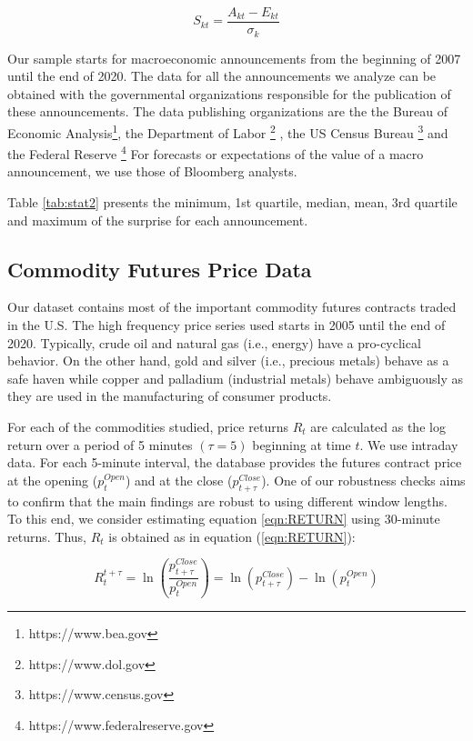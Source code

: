 \documentclass[12pt]{article}
\begin{document}
\begin{equation}\label{eqn:SURPRISE}
S_{kt}=\frac{A_{kt}-E_{kt}}{\sigma_k}
\end{equation}

Our sample starts for macroeconomic announcements from the beginning of 2007 until the end of 2020. The data for all the announcements we analyze can be obtained with the governmental organizations responsible for the publication of these announcements. The data publishing organizations are the the Bureau of Economic Analysis\footnote{https://www.bea.gov}, the Department of Labor \footnote{https://www.dol.gov} , the US Census Bureau \footnote{https://www.census.gov}  and the  Federal Reserve \footnote{https://www.federalreserve.gov}
For forecasts or expectations of the value of a macro announcement, we use those of Bloomberg analysts. 

Table \ref{tab:stat2} presents the minimum, 1st quartile, median, mean, 3rd quartile and maximum of the surprise for each announcement. 
\subsection{Commodity Futures Price Data}

Our dataset contains most of the important commodity futures contracts traded in the U.S. The high frequency price series used starts in 2005 until the end of 2020.
Typically, crude oil and natural gas (i.e., energy) have a pro-cyclical behavior. On the other hand, gold and silver (i.e., precious metals) behave as a safe haven while copper and palladium (industrial metals) behave ambiguously as they are used in the manufacturing of consumer products.


For each of the commodities studied, price returns $R_t$ are calculated as the log return over a period of 5 minutes $(\tau=5)$ beginning at time $t$. We use intraday data. For each 5-minute interval, the database provides the futures contract price at the opening ($p_{t}^{Open}$)  and at the close ($p_{t+\tau}^{Close}$). One of our robustness checks aims to confirm that the main findings are robust to using different window lengths. To this end, we consider estimating equation \ref{eqn:RETURN}  using 30-minute returns.  Thus, $R_t$ is obtained  as in equation (\ref{eqn:RETURN}):

\begin{equation}\label{eqn:RETURN}
R_t^{t+\tau}=\ln \left( \frac{p_{t+\tau}^{Close}}{p_{t}^{Open}} \right)=\ln (p_{t+\tau}^{Close})-\ln(p_{t}^{Open})
\end{equation}
\end{document}

